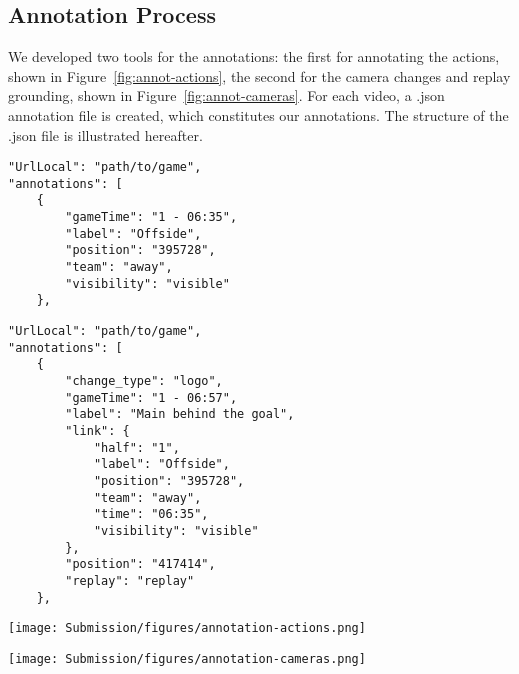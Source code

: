\documentclass[final]{cvsports}
\begin{document}
\subsection{Annotation Process}

We developed two tools for the annotations: the first for annotating the actions, shown in Figure~\ref{fig:annot-actions}, the second for the camera changes and replay grounding, shown in Figure~\ref{fig:annot-cameras}. For each video, a .json annotation file is created, which constitutes our annotations. The structure of the .json file is illustrated hereafter.

\lstset{basicstyle=\scriptsize\ttfamily}

\begin{lstlisting}[caption=Example of an action annotation in json.]
"UrlLocal": "path/to/game",
"annotations": [
    {
        "gameTime": "1 - 06:35",
        "label": "Offside",
        "position": "395728",
        "team": "away",
        "visibility": "visible"
    },
\end{lstlisting}

\begin{lstlisting}[caption=Example of a camera change annotation in json.]
"UrlLocal": "path/to/game",
"annotations": [
    {
        "change_type": "logo",
        "gameTime": "1 - 06:57",
        "label": "Main behind the goal",
        "link": {
            "half": "1",
            "label": "Offside",
            "position": "395728",
            "team": "away",
            "time": "06:35",
            "visibility": "visible"
        },
        "position": "417414",
        "replay": "replay"
    },
\end{lstlisting}


\begin{figure*}
    \centering
    \texttt{[image: Submission/figures/annotation-actions.png]}
    \caption{\textbf{Actions annotation tool.} When an action occurs, the annotator pauses the video to open the annotation menu (bottom left) and selects the action, the team that performs it, and whether it is shown or unshown in the video. The right column provides all the actions already annotated for that game, sorted chronologically.}
    \label{fig:annot-actions}
\end{figure*}


\begin{figure*}
    \centering
    \texttt{[image: Submission/figures/annotation-cameras.png]}
    \caption{\textbf{Cameras annotation tool.} When a camera transition occurs (in this case, just before for a better visualization), the annotator pauses the video to open the annotation menu (bottom left) and selects the type of camera, the upcoming transition, and the real-time or replay characteristic of the current shot. In the case of a replay, as shown here, the annotator selects the action replayed in the last column, with the possibility to visualize a short clip around the action selected to ensure the correctness of the annotation. The large column on the right provides all the camera shots already annotated for that game, sorted chronologically.}
    \label{fig:annot-cameras}
\end{figure*}
\end{document}
